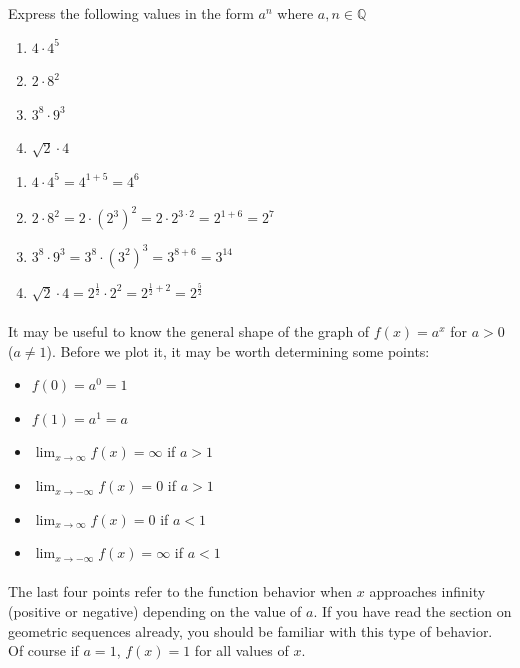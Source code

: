 \documentclass[12pt, a4paper, titlepage, twoside]{article}
\newcommand*{\Q}{\mathbb{Q}}
\newcounter{excount}[subsection]
\begin{document}
	\begin{ex}
		Express the following values in the form $a^n$ where $a, n \in \Q$
		
		\begin{enumerate}[label=\textbf{(\alph*)}]
			\item $4 \cdot 4^5$
			\item $2 \cdot 8^2$
			\item $3^8 \cdot 9^3$
			\item $\sqrt{2} \cdot 4$
		\end{enumerate}
		
		\tcbline
		
		\begin{enumerate}[label=\textbf{(\alph*)}]
			\item $4 \cdot 4^5 = 4^{1+5} = 4^6$
			\item $2 \cdot 8^2 = 2 \cdot (2^3)^2 = 2 \cdot 2^{3 \cdot 2} = 2^{1+6} = 2^7$
			\item $3^8 \cdot 9^3 = 3^8 \cdot (3^2)^3 = 3^{8+6} = 3^{14}$
			\item $\sqrt{2} \cdot 4 = 2^{\frac{1}{2}} \cdot 2^2 = 2^{\frac{1}{2} + 2} = 2^{\frac{5}{2}}$
		\end{enumerate}
	\end{ex}
	
	\paragraph{}
	It may be useful to know the general shape of the graph of $f(x) = a^x$ for $a > 0$ ($a \neq 1$). Before we plot it, it may be worth
	determining some points:
	
	\begin{itemize}
		\item $f(0) = a^0 = 1$
		\item $f(1) = a^1 = a$
		\item $\displaystyle \lim_{x \to \infty} f(x) = \infty$ if $a>1$
		\item $\displaystyle \lim_{x \to -\infty} f(x) = 0$ if $a>1$
		\item $\displaystyle \lim_{x \to \infty} f(x) = 0$ if $a<1$
		\item $\displaystyle \lim_{x \to -\infty} f(x) = \infty$ if $a<1$
	\end{itemize}
	
	\paragraph{}
	The last four points refer to the function behavior when $x$ approaches infinity (positive or negative) depending on the
	value of $a$. If you have read the section on geometric sequences already, you should be familiar with this type of behavior.
	Of course if $a = 1$, $f(x) = 1$ for all values of $x$.\\
\end{document}
